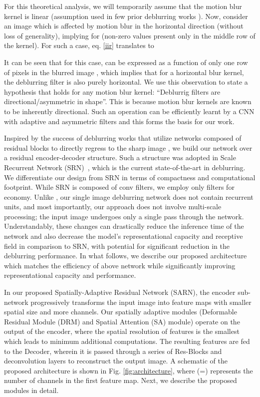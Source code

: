 \documentclass[10pt,twocolumn,letterpaper]{article}
\begin{document}
For this theoretical analysis, we will temporarily assume that the motion blur kernel  is linear (assumption used in few prior deblurring works \cite{sun2015learning,gong2017motion}). Now, consider an  image  which is affected by motion blur in the horizontal direction (without loss of generality), implying  for  (non-zero values present only in the middle row of the kernel). For such a case, eq. \ref{iir} translates to
 

It can be seen that for this case,  can be expressed as a function of only one row of pixels in the blurred image , which implies that for a horizontal blur kernel, the deblurring filter is also purely horizontal. We use this observation to state a hypothesis that holds for any motion blur kernel: ``Deblurrig filters are directional/asymmetric in shape''. This is because motion blur kernels are known to be inherently directional. Such an operation can be efficiently learnt by a CNN with adaptive and asymmetric filters and this forms the basis for our work.



Inspired by the success of deblurring works that utilize networks composed of residual blocks to directly regress to the sharp image \cite{nimisha2017blur,nah2017deep,tao2018scale}, we build our network over a residual encoder-decoder structure. Such a structure was adopted in Scale Recurrent Network (SRN)~\cite{tao2018scale}, which is the current state-of-the-art in deblurring. We differentiate our design from SRN in terms of compactness and computational footprint. While SRN is composed of  conv filters, we employ only  filters for economy. Unlike \cite{tao2018scale}, our single image deblurring network does not contain recurrent units, and most importantly, our approach does not involve multi-scale processing; the input image undergoes only a single pass through the network. Understandably, these changes can drastically reduce the inference time of the network and also decrease the model's representational capacity and receptive field in comparison to SRN, with potential for significant reduction in the deblurring performance. In what follows, we describe our proposed architecture which matches the efficiency of above network while significantly improving representational capacity and performance.

In our proposed Spatially-Adaptive Residual Network (SARN), the encoder sub-network progressively transforms the input image into feature maps with smaller spatial size and more channels. Our spatially adaptive modules (Deformable Residual Module (DRM) and Spatial Attention (SA) module) operate on the output of the encoder, where the spatial resolution of features is the smallest which leads to minimum additional computations. The resulting features are fed to the Decoder, wherein it is passed through a series of Res-Blocks and deconvolution layers to reconstruct the output image. A schematic of the proposed architecture is shown in Fig. \ref{fig:architecture}, where  (=) represents the number of channels in the first feature map. Next, we describe the proposed modules in detail.
\end{document}
